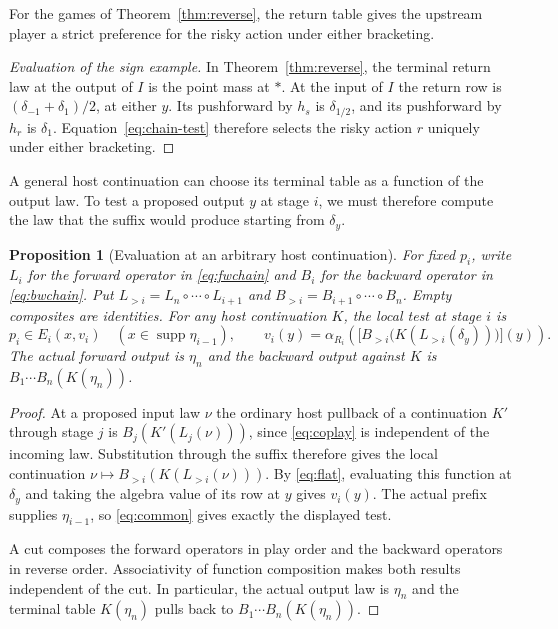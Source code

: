 \documentclass[11pt,a4paper]{article}
\newtheorem{proposition}[theorem]{Proposition}
\theoremstyle{definition}
\newcommand{\supp}{\operatorname{supp}}
\begin{document}
For the games of Theorem~\ref{thm:reverse}, the return table gives the upstream player a strict preference for the risky action under either bracketing.

\begin{proof}[Evaluation of the sign example]
    In Theorem~\ref{thm:reverse}, the terminal return law at the output of $I$ is the point mass at $*$. At the input of $I$ the return row is $(\delta_{-1}+\delta_1)/2$, at either $y$. Its pushforward by $h_s$ is $\delta_{1/2}$, and its pushforward by $h_r$ is $\delta_1$. Equation~\eqref{eq:chain-test} therefore selects the risky action $r$ uniquely under either bracketing.
\end{proof}

A general host continuation can choose its terminal table as a function of the output law. To test a proposed output $y$ at stage $i$, we must therefore compute the law that the suffix would produce starting from $\delta_y$.

\begin{proposition}[Evaluation at an arbitrary host continuation]\label{prop:allcontexts}
    For fixed $p_i$, write $L_i$ for the forward operator in \eqref{eq:fwchain} and $B_i$ for the backward operator in \eqref{eq:bwchain}. Put $L_{>i}=L_n\circ\cdots\circ L_{i+1}$ and $B_{>i}=B_{i+1}\circ\cdots\circ B_n$. Empty composites are identities. For any host continuation $K$, the local test at stage $i$ is
    \[
        p_i\in E_i(x,v_i)\quad(x\in\supp\eta_{i-1}),\qquad
        v_i(y)=\alpha_{R_i}\!\left(
        \big[B_{>i}\big(K(L_{>i}(\delta_y))\big)\big](y)\right).
    \]
    The actual forward output is $\eta_n$ and the backward output against $K$ is $B_1\cdots B_n(K(\eta_n))$.
\end{proposition}
\begin{proof}
    At a proposed input law $\nu$ the ordinary host pullback of a continuation $K'$ through stage $j$ is $B_j(K'(L_j(\nu)))$, since \eqref{eq:coplay} is independent of the incoming law. Substitution through the suffix therefore gives the local continuation $\nu\mapsto B_{>i}(K(L_{>i}(\nu)))$. By \eqref{eq:flat}, evaluating this function at $\delta_y$ and taking the algebra value of its row at $y$ gives $v_i(y)$. The actual prefix supplies $\eta_{i-1}$, so \eqref{eq:common} gives exactly the displayed test.

    A cut composes the forward operators in play order and the backward operators in reverse order. Associativity of function composition makes both results independent of the cut. In particular, the actual output law is $\eta_n$ and the terminal table $K(\eta_n)$ pulls back to $B_1\cdots B_n(K(\eta_n))$.
\end{proof}
\end{document}

